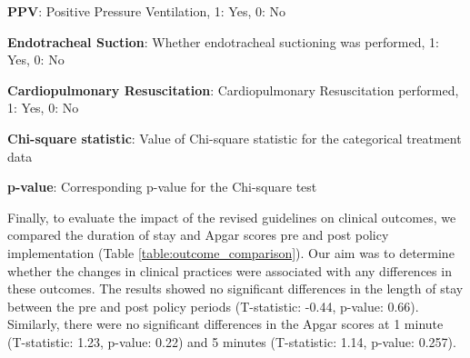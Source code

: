 \documentclass[11pt]{article}
\begin{document}
\begin{table}[h]
\caption{Comparison of treatment options pre and post policy implementation}
\label{table:treatment_comparison}
\begin{threeparttable}
\renewcommand{\TPTminimum}{\linewidth}
\begin{tablenotes}
\footnotesize
\item \textbf{PPV}: Positive Pressure Ventilation, 1: Yes, 0: No
\item \textbf{Endotracheal Suction}: Whether endotracheal suctioning was performed, 1: Yes, 0: No
\item \textbf{Cardiopulmonary Resuscitation}: Cardiopulmonary Resuscitation performed, 1: Yes, 0: No
\item \textbf{Chi-square statistic}: Value of Chi-square statistic for the categorical treatment data
\item \textbf{p-value}: Corresponding p-value for the Chi-square test
\end{tablenotes}
\end{threeparttable}
\end{table}


Finally, to evaluate the impact of the revised guidelines on clinical outcomes, we compared the duration of stay and Apgar scores pre and post policy implementation (Table {}\ref{table:outcome_comparison}). Our aim was to determine whether the changes in clinical practices were associated with any differences in these outcomes. The results showed no significant differences in the length of stay between the pre and post policy periods (T-statistic: -0.44, p-value: 0.66). Similarly, there were no significant differences in the Apgar scores at 1 minute (T-statistic: 1.23, p-value: 0.22) and 5 minutes (T-statistic: 1.14, p-value: 0.257).
\end{document}
